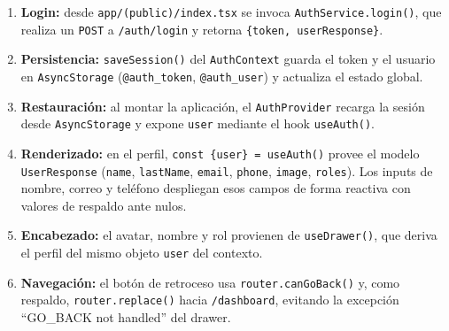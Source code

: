\documentclass[12pt,a4paper]{article}
\begin{document}
\begin{enumerate}
\item \textbf{Login:} desde \texttt{app/(public)/index.tsx} se invoca \texttt{AuthService.login()}, que realiza un \texttt{POST} a \texttt{/auth/login} y retorna \texttt{\{token, userResponse\}}.
\item \textbf{Persistencia:} \texttt{saveSession()} del \texttt{AuthContext} guarda el token y el usuario en \texttt{AsyncStorage} (\texttt{@auth\_token}, \texttt{@auth\_user}) y actualiza el estado global.
\item \textbf{Restauraci\'on:} al montar la aplicaci\'on, el \texttt{AuthProvider} recarga la sesi\'on desde \texttt{AsyncStorage} y expone \texttt{user} mediante el hook \texttt{useAuth()}.
\item \textbf{Renderizado:} en el perfil, \texttt{const \{user\} = useAuth()} provee el modelo \texttt{UserResponse} (\texttt{name}, \texttt{lastName}, \texttt{email}, \texttt{phone}, \texttt{image}, \texttt{roles}). Los inputs de nombre, correo y tel\'efono despliegan esos campos de forma reactiva con valores de respaldo ante nulos.
\item \textbf{Encabezado:} el avatar, nombre y rol provienen de \texttt{useDrawer()}, que deriva el perfil del mismo objeto \texttt{user} del contexto.
\item \textbf{Navegaci\'on:} el bot\'on de retroceso usa \texttt{router.canGoBack()} y, como respaldo, \texttt{router.replace()} hacia \texttt{/dashboard}, evitando la excepci\'on ``GO\_BACK not handled'' del drawer.
\end{enumerate}

\vspace{0.4cm}
\end{document}
